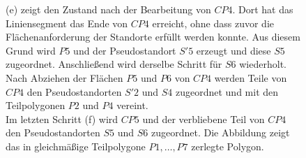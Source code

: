 \documentclass[ngerman]{seminarbeitrag}
\begin{document}
\begin{figure}[h]
{ (e) zeigt den Zustand nach der Bearbeitung von $CP4$. Dort hat das Liniensegment das Ende von $CP4$ erreicht, ohne dass zuvor die Flächenanforderung der Standorte erfüllt werden konnte. Aus diesem Grund wird $P5$ und der Pseudostandort $S'5$ erzeugt und diese $S5$ zugeordnet. Anschließend wird derselbe Schritt für $S6$ wiederholt. Nach Abziehen der Flächen $P5$ und $P6$ von $CP4$ werden Teile von $CP4$ den Pseudostandorten $S'2$ und $S4$ zugeordnet und mit den Teilpolygonen $P2$ und $P4$ vereint.\\
Im letzten Schritt (f) wird $CP5$ und der verbliebene Teil von $CP4$ den Pseudostandorten $S5$ und $S6$ zugeordnet. Die Abbildung zeigt das in gleichmäßige Teilpolygone $P1,…,P7$ zerlegte Polygon.}
\label{beispiel nicht konvex}
\end{figure}


\end{document}
